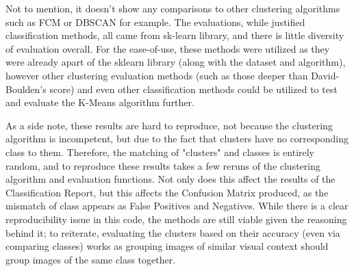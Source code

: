 \documentclass[10pt,twocolumn]{article}
\begin{document}
Not to mention, it doesn't show any comparisons to other clustering algorithms such as FCM or DBSCAN for example. The evaluations, while justified classification methods, all came from sk-learn library, and there is little diversity of evaluation overall. For the ease-of-use, these methods were utilized as they were already apart of the sklearn library (along with the dataset and algorithm), however other clustering evaluation methods (such as those deeper than David-Boulden's score) and even other classification methods could be utilized to test and evaluate the K-Means algorithm further.


As a side note, these results are hard to reproduce, not because the clustering algorithm is incompetent, but due to the fact that clusters have no corresponding class to them. Therefore, the matching of "clusters" and classes is entirely random, and to reproduce these results takes a few reruns of the clustering algorithm and evaluation functions. Not only does this affect the results of the Classification Report, but this affects the Confusion Matrix produced, as the mismatch of class appears as False Positives and Negatives. While there is a clear reproducibility issue in this code, the methods are still viable given the reasoning behind it; to reiterate, evaluating the clusters based on their accuracy (even via comparing classes) works as grouping images of similar visual context should group images of the same class together.





\printbibliography
 
\end{document}
